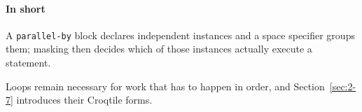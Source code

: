 \paragraph*{In short}

A \texttt{parallel-by} block declares independent instances and a space specifier groups them; masking then decides which of those instances actually execute a statement.

Loops remain necessary for work that has to happen in order, and Section~\ref{sec:2-7} introduces their Croqtile forms.
